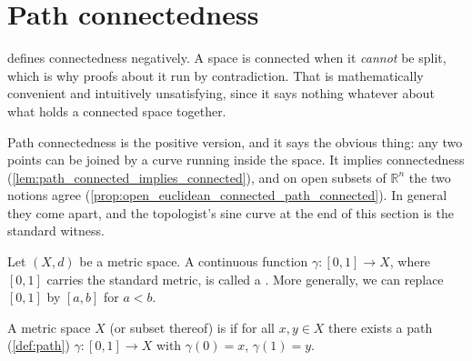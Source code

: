 
\section{Path connectedness}
\label{sec:path_connectedness}

 defines connectedness negatively. A space is connected when it
\emph{cannot} be split, which is why proofs about it run by contradiction. That is mathematically
convenient and intuitively unsatisfying, since it says nothing whatever about what holds a
connected space together.

Path connectedness is the positive version, and it says the obvious thing: any two points can be
joined by a curve running inside the space. It implies connectedness
(\cref{lem:path_connected_implies_connected}), and on open subsets of $\mathbb{R}^n$ the two
notions agree (\cref{prop:open_euclidean_connected_path_connected}). In general they come apart,
and the topologist's sine curve at the end of this section is the standard witness.

\begin{definition}[Path]
\label{def:path}
Let $(X,d)$ be a metric space. A continuous function $\gamma : [0,1] \to X$, where $[0,1]$
carries the standard metric, is called a  . More generally, we
can replace $[0,1]$ by $[a,b]$ for $a < b$.
\end{definition}

\begin{definition}
\label{def:path_connected}
A metric space $X$ (or subset thereof) is 
 if for all $x, y \in X$ there exists a path
(\cref{def:path}) $\gamma : [0,1] \to X$ with $\gamma(0) = x$, $\gamma(1) = y$.
\begin{center}
\end{center}
\end{definition}


